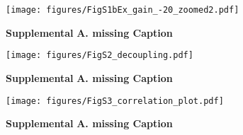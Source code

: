 \documentclass[10pt,a4paper]{article}
\begin{document}
\begin{figure}[!ht]
\begin{center}
\texttt{[image: figures/FigS1bEx\_gain\_-20\_zoomed2.pdf]}
\caption{{\bf Supplemental} {\bf A. missing Caption} 
\label{fig:FigS1a}}
\end{center}
\end{figure}



\begin{figure}[!ht]
\begin{center}
\texttt{[image: figures/FigS2\_decoupling.pdf]}
\caption{{\bf Supplemental} {\bf A. missing Caption} 
\label{fig:FigS1a}}
\end{center}
\end{figure}


\begin{figure}[!ht]
\begin{center}
\texttt{[image: figures/FigS3\_correlation\_plot.pdf]}
\caption{{\bf Supplemental} {\bf A. missing Caption} 
\label{fig:FigS1a}}
\end{center}
\end{figure}




\clearpage



\end{document}
